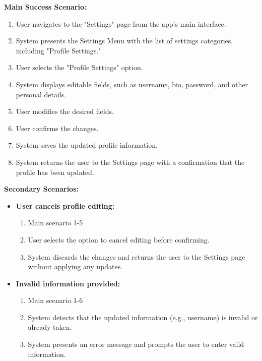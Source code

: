 \documentclass{article}
\begin{document}
\begin{enumerate}[label=\textbf{UC\arabic*}]
        \textbf{Main Success Scenario:}
        \begin{enumerate}[label=\textbf{\arabic*.}]
            \item User navigates to the "Settings" page from the app’s main interface.
            \item System presents the Settings Menu with the list of settings categories, including "Profile Settings."
            \item User selects the "Profile Settings" option.
            \item System displays editable fields, such as username, bio, password, and other personal details.
            \item User modifies the desired fields.
            \item User confirms the changes.
            \item System saves the updated profile information.
            \item System returns the user to the Settings page with a confirmation that the profile has been updated.
        \end{enumerate}
        
        \textbf{Secondary Scenarios:}
        \begin{itemize}
            \item[{}] \textbf{User cancels profile editing:}
            \begin{enumerate}[label=\textbf{\arabic*.}]
                \item Main scenario 1-5
                \item User selects the option to cancel editing before confirming.
                \item System discards the changes and returns the user to the Settings page without applying any updates.
            \end{enumerate}
            
            \item[{}] \textbf{Invalid information provided:}
            \begin{enumerate}[label=\textbf{\arabic*.}]
                \item Main scenario 1-6
                \item System detects that the updated information (e.g., username) is invalid or already taken.
                \item System presents an error message and prompts the user to enter valid information.
            \end{enumerate}
        \end{itemize}
        

\end{enumerate}
\end{document}

